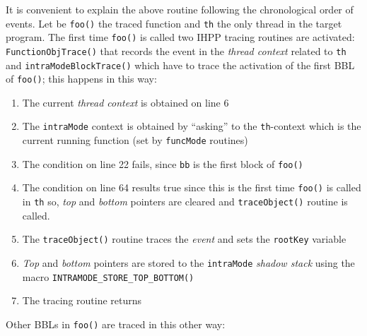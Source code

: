 \documentclass[a4paper,10pt]{report}
\begin{document}
\noindent
It is convenient to explain the above routine following the chronological
order of events. Let be \verb|foo()| the traced function and \verb|th| 
the only thread in the target program. The first time \verb|foo()| is called
two IHPP tracing routines are activated: \verb|FunctionObjTrace()| that
records the event in the \emph{thread context} related to \verb|th| and
\verb|intraModeBlockTrace()| which have to trace the activation of 
the first BBL of \verb|foo()|; this happens in this way:

\begin{enumerate}
\item The current \emph{thread context} is obtained on line 6
\item The \verb|intraMode| context is obtained by ``asking'' to 
the \verb|th|-context which is 
the current running function (set by \verb|funcMode| routines)
\item The condition on line 22 fails, since \verb|bb| is the first block of \verb|foo()|
\item The condition on line 64 results true since this is the first time
\verb|foo()| is called in \verb|th| so, \emph{top} and \emph{bottom}
pointers are cleared and \verb|traceObject()| routine is called.
\item The \verb|traceObject()| routine traces the \emph{event} and
sets the \verb|rootKey| variable
\item \emph{Top} and \emph{bottom} pointers are stored to the 
\verb|intraMode| \emph{shadow stack} using the macro \verb|INTRAMODE_STORE_TOP_BOTTOM()|
\item The tracing routine returns
\end{enumerate}

\noindent
Other BBLs in \verb|foo()| are traced in this other way:
\end{document}
